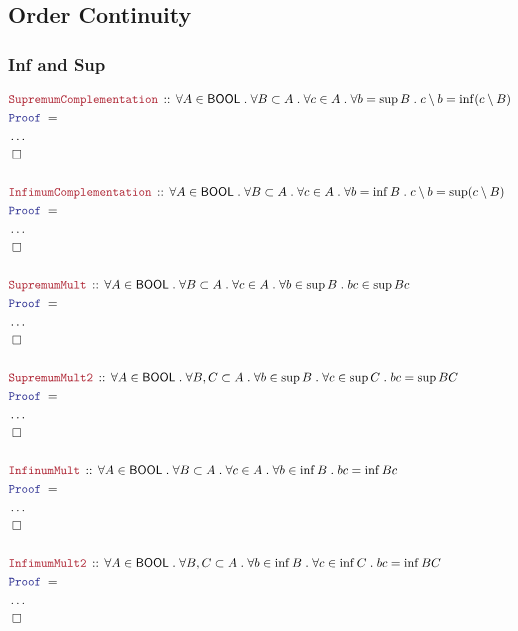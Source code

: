 \documentclass[12pt]{scrartcl}
\newcommand{\LOGIC}[1]{\textcolor{Blue}{\mathtt{#1}}}
\newcommand{\THM}[1]{\textcolor{Maroon}{\mathtt{#1}}}
\renewcommand{\.}{\; . \;}
\newcommand{\Theorem}[2]{& \THM{#1} \, :: \, #2 \\ & \Proof = \\ }
\newcommand{\Page}[1]{ \begin{align*} #1 \end{align*}   }
\newcommand{\NoProof}{ & \ldots \\ \EndProof}
\newcommand{\QED}{\; \square}
\newcommand{\EndProof}{& \QED \\}
\newcommand{\Proof}{\LOGIC{Proof} \; }
\newcommand{\BOOL}{\mathsf{BOOL}}
\begin{document}
\subsection{Order Continuity}
\subsubsection{Inf and Sup}
\Page{
	\Theorem{SupremumComplementation}
	{
		\forall A \in \BOOL \.
		\forall B \subset A \.
		\forall c \in A \.
		\forall b = \sup B \.
		c \setminus b = \inf(c \setminus B)
	}
	\NoProof
	\\
	\Theorem{InfimumComplementation}
	{
		\forall A \in \BOOL \.
		\forall B \subset A \.
		\forall c \in A \.
		\forall b = \inf B \.
		c \setminus b =  \sup(c \setminus B)
	}
	\NoProof
	\\
	\Theorem{SupremumMult}
	{
		\forall A \in \BOOL \.
		\forall B \subset A \.
		\forall c \in A \.
		\forall b \in \sup B \.
		bc \in  \sup Bc
	}
	\NoProof
	\\
	\Theorem{SupremumMult2}
	{
		\forall A \in \BOOL \.
		\forall B, C \subset A \.
		\forall b \in \sup B \.
		\forall c \in \sup C \.
		bc =  \sup BC
	}
	\NoProof
	\\
	\Theorem{InfinumMult}
	{
		\forall A \in \BOOL \.
		\forall B \subset A \.
		\forall c \in A \.
		\forall b \in \inf B \.
		bc =  \inf Bc
	}
	\NoProof
	\\
	\Theorem{InfimumMult2}
	{
		\forall A \in \BOOL \.
		\forall B, C \subset A \.
		\forall b \in \inf B \.
		\forall c \in \inf C \.
		bc  =  \inf BC
	}
	\NoProof
}
\end{document}

